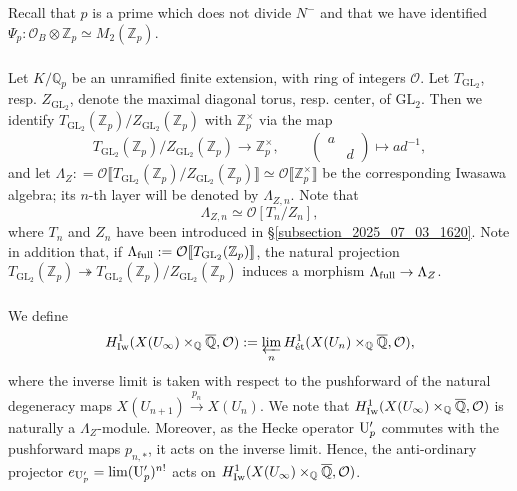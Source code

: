 \documentclass{amsart}
\numberwithin{equation}{section}
\newcommand{\QQ}{\mathbb{Q}}
\newcommand{\ZZ}{\mathbb{Z}}
\newcommand{\GL}{\mathrm{GL}}
\newcommand{\lra}{\longrightarrow}
\newcommand{\etale}{\textup{\'et}}
\newcommand{\Q}{\QQ}
\begin{document}
Recall that $p$ is a prime which does not divide $N^-$ and that we have identified $\Psi_p: \mathcal{O}_B \otimes \ZZ_p \simeq M_2(\ZZ_p)$. 

\subsubsection{} Let $K/\QQ_p$ be an unramified finite extension, with ring of integers $\mathcal{O}$. Let $T_{\GL_2}$, resp.  $Z_{\GL_2}$, denote the maximal diagonal torus, resp. center, of $\GL_2$. Then we identify $T_{\GL_2}(\ZZ_p) / Z_{\GL_2}(\ZZ_p)$ with $\ZZ_p^\times$ via the map
$$ T_{\GL_2}(\ZZ_p) / Z_{\GL_2}(\ZZ_p) \lra \ZZ_p^\times,\, \qquad \left( \begin{smallmatrix}a & \\ & d \end{smallmatrix}\right) \mapsto a d^{-1},$$ and let $\Lambda_Z : = \mathcal{O}\llbracket T_{\GL_2}(\ZZ_p) / Z_{\GL_2}(\ZZ_p)\rrbracket \simeq \mathcal{O} \llbracket\ZZ_p^\times \rrbracket$ be the corresponding Iwasawa algebra; its $n$-th layer will be denoted by $\Lambda_{Z,n}$. Note that $$\Lambda_{Z,n} \simeq \mathcal{O}[T_n/Z_n],$$
where $T_n$ and $Z_n$ have been introduced in \S \ref{subsection_2025_07_03_1620}. Note in addition that, if $\Lambda_{\rm full} : = \mathcal{O}\llbracket T_{\GL_2}(\ZZ_p)\rrbracket$, the natural projection $T_{\GL_2}(\ZZ_p) \twoheadrightarrow T_{\GL_2}(\ZZ_p) / Z_{\GL_2}(\ZZ_p)$ induces a morphism $\Lambda_{\rm full} \to \Lambda_Z$.

\subsubsection{} We define 
$$ H^1_{\rm Iw}( X(U_\infty)\times_{\QQ} \overline{\Q}, \mathcal{O}) : = \varprojlim_n H^1_{\etale}( X(U_n)\times_{\QQ} \overline{\Q}, \mathcal{O}),$$ 
where the inverse limit is taken with respect to the pushforward of the natural degeneracy maps $X(U_{n+1})  \xrightarrow{p_n} X(U_n)$.  We note that $H^1_{\rm Iw}( X(U_\infty)\times_{\QQ} \overline{\Q}, \mathcal{O})$ is naturally a $\Lambda_Z$-module. Moreover, as the Hecke operator ${\rm U}_p'$ commutes with the pushforward maps $p_{n,*}$, it acts on the inverse limit. Hence, the anti-ordinary projector $e_{{\rm U}_{p}'}=\lim ({\rm U}_p')^{n!}$ acts on $H^1_{\rm Iw}( X(U_\infty)\times_{\QQ} \overline{\Q}, \mathcal{O})$. 
\end{document}
